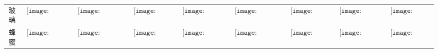 \begin{longtable}{|c|cccccccc|}
玻璃&$\begin{array}{c}\texttt{[image: figures/Glass\_Candle.png]}\end{array}$&$\begin{array}{c}\texttt{[image: figures/Glass\_Candelabra.png]}\end{array}$&$\begin{array}{c}\texttt{[image: figures/Glass\_Lamp.png]}\end{array}$&$\begin{array}{c}\texttt{[image: figures/Glass\_Lantern.png]}\end{array}$&$\begin{array}{c}\texttt{[image: figures/Glass\_Chandelier.png]}\end{array}$&$\begin{array}{c}\texttt{[image: figures/Glass\_Door.png]}\end{array}$&$\begin{array}{c}\texttt{[image: figures/Glass\_Toilet.png]}\end{array}$&$\begin{array}{c}\texttt{[image: figures/Glass\_Chest.png]}\end{array}$\\
蜂蜜&$\begin{array}{c}\texttt{[image: figures/Honey\_Candle.png]}\end{array}$&$\begin{array}{c}\texttt{[image: figures/Honey\_Candelabra.png]}\end{array}$&$\begin{array}{c}\texttt{[image: figures/Honey\_Lamp.png]}\end{array}$&$\begin{array}{c}\texttt{[image: figures/Honey\_Lantern.png]}\end{array}$&$\begin{array}{c}\texttt{[image: figures/Honey\_Chandelier.png]}\end{array}$&$\begin{array}{c}\texttt{[image: figures/Honey\_Door.png]}\end{array}$&$\begin{array}{c}\texttt{[image: figures/Honey\_Toilet.png]}\end{array}$&$\begin{array}{c}\texttt{[image: figures/Honey\_Chest.png]}\end{array}$\\

\end{longtable}
